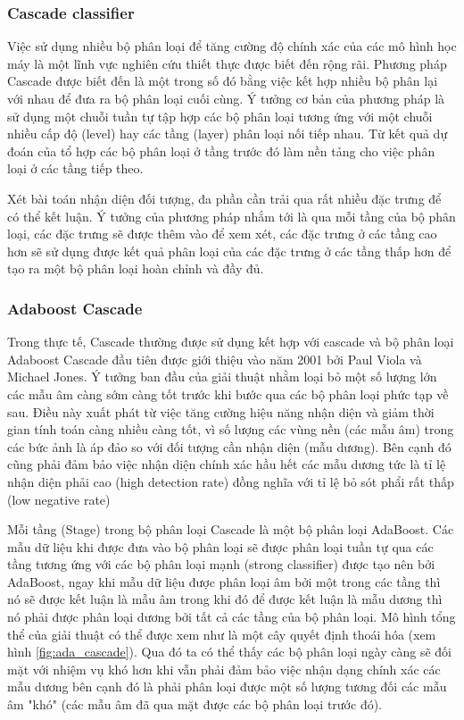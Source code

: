 \documentclass[12pt,a4paper]{article}
\begin{document}
\subsubsection{Cascade classifier}
Việc sử dụng nhiều bộ phân loại để tăng cường độ chính xác của các mô hình học máy là một lĩnh vực nghiên cứu thiết thực được biết đến rộng rãi. Phương pháp Cascade được biết đến là một trong số đó bằng việc kết hợp nhiều bộ phân lại với nhau để đưa ra bộ phân loại cuối cùng. Ý tưởng cơ bản của phương pháp là sử dụng một chuỗi tuần tự  tập hợp các bộ phân loại tương ứng với một chuỗi nhiều cấp độ (level) hay các tầng (layer) phân loại nối tiếp nhau. Từ kết quả dự đoán của tổ hợp các bộ phân loại ở tầng trước đó làm nền tảng cho việc phân loại ở các tầng tiếp theo.

Xét bài toán nhận diện đối tượng, đa phần cần trải qua rất nhiều đặc trưng để có thể kết luận. Ý tưởng của phương pháp nhắm tới là qua mỗi tầng của bộ phân loại, các đặc trưng sẽ được thêm vào để xem xét, các đặc trưng ở các tầng cao hơn sẽ sử dụng được kết quả phân loại của các đặc trưng ở các tầng thấp hơn để tạo ra một bộ phân loại hoàn chỉnh và đầy đủ.

\subsubsection{Adaboost Cascade}
Trong thực tế, Cascade thường được sử dụng kết hợp với cascade và bộ phân loại Adaboost Cascade đầu tiên được giới thiệu vào năm 2001 bởi  Paul Viola và Michael Jones. Ý tưởng ban đầu của giải thuật nhằm loại bỏ một số lượng lớn các mẫu âm càng sớm càng tốt trước khi bước qua các bộ phân loại phức tạp về sau. Điều này xuất phát từ việc tăng cường hiệu năng nhận diện và giảm thời gian tính toán càng nhiều càng tốt, vì số lượng các vùng nền (các mẫu âm) trong các bức ảnh là áp đảo so với đối tượng cần nhận diện (mẫu dương). Bên cạnh đó cũng phải đảm bảo việc nhận diện chính xác hầu hết các mẫu dương tức là tỉ lệ nhận diện phải cao (high detection rate)
đồng nghĩa với tỉ lệ bỏ sót phẩi rất thấp (low negative rate)

Mỗi tầng (Stage) trong bộ phân loại Cascade là một bộ phân loại AdaBoost. Các mẫu dữ liệu khi được đưa vào bộ phân loại sẽ được phân loại tuần tự qua các tầng tương ứng với các bộ phân loại mạnh (strong classifier) được tạo nên bởi AdaBoost, ngay khi mẫu dữ liệu được phân loại âm bởi một trong các tầng thì nó sẽ được kết luận là mẫu âm trong khi đó để được kết luận là mẫu dương thì nó phải được phân loại dương bởi tất cả các tầng của bộ phân loại. Mô hình tổng thể của giải thuật có thể được xem như là một cây quyết định thoái hóa (xem hình \ref{fig:ada_cascade}). Qua đó ta có thể thấy các bộ phân loại ngày càng sẽ đối mặt với nhiệm vụ khó hơn khi vẫn phải đảm bảo việc nhận dạng chính xác các mẫu dương bên cạnh đó là phải phân loại được một số lượng tương đối các mẫu âm "khó" (các mẫu âm đã qua mặt được các bộ phân loại trước đó).
\end{document}
